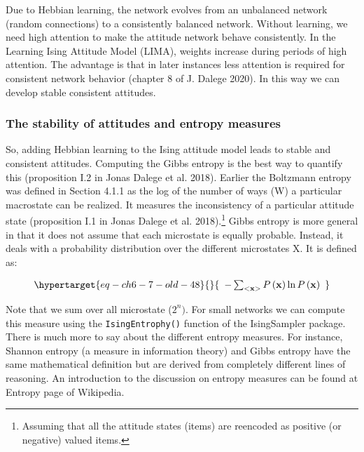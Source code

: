 \documentclass[
  letterpaper,
]{scrbook}
\begin{document}
Due to Hebbian learning, the network evolves from an unbalanced network
(random connections) to a consistently balanced network. Without
learning, we need high attention to make the attitude network behave
consistently. In the Learning Ising Attitude Model (LIMA), weights
increase during periods of high attention. The advantage is that in
later instances less attention is required for consistent network
behavior (chapter 8 of J. Dalege 2020). In this way we can develop
stable consistent attitudes.

\hypertarget{the-stability-of-attitudes-and-entropy-measures}{%
\subsubsection{The stability of attitudes and entropy
measures}\label{the-stability-of-attitudes-and-entropy-measures}}

So, adding Hebbian learning to the Ising attitude model leads to stable
and consistent attitudes. Computing the Gibbs entropy is the best way to
quantify this (proposition I.2 in Jonas Dalege et al. 2018). Earlier the
Boltzmann entropy was defined in Section 4.1.1 as the log of the number
of ways (W) a particular macrostate can be realized. It measures the
inconsistency of a particular attitude state (proposition I.1 in Jonas
Dalege et al. 2018).\footnote{Assuming that all the attitude states
  (items) are reencoded as positive (or negative) valued items.} Gibbs
entropy is more general in that it does not assume that each microstate
is equally probable. Instead, it deals with a probability distribution
over the different microstates X. It is defined as:

\begin{equation}\protect\hypertarget{eq-ch6-7-old-48}{}{\begin{array}{r}
 - \sum_{< \mathbf{x} >}^{}{P\left( \mathbf{x} \right)\ln{P\left( \mathbf{x} \right)}}
\end{array}}\label{eq-ch6-7-old-48}\end{equation}

Note that we sum over all microstate (\(2^{n})\). For small networks we
can compute this measure using the \texttt{IsingEntrophy()} function of
the IsingSampler package. There is much more to say about the different
entropy measures. For instance, Shannon entropy (a measure in
information theory) and Gibbs entropy have the same mathematical
definition but are derived from completely different lines of reasoning.
An introduction to the discussion on entropy measures can be found at
Entropy page of Wikipedia.
\end{document}
